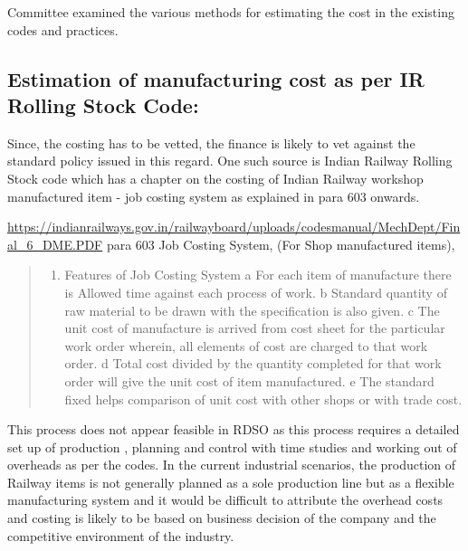 \documentclass[
  11pt,
  twoside]{article}
\providecommand{\tightlist}{%
  \setlength{\itemsep}{0pt}\setlength{\parskip}{0pt}}
\begin{document}
Committee examined the various methods for estimating the cost in the existing codes and practices.

\hypertarget{estimation-of-manufacturing-cost-as-per-ir-rolling-stock-code}{%
\subsection{Estimation of manufacturing cost as per IR Rolling Stock Code:}\label{estimation-of-manufacturing-cost-as-per-ir-rolling-stock-code}}

Since, the costing has to be vetted, the finance is likely to vet against the standard policy issued in this regard. One such source is Indian Railway Rolling Stock code which has a chapter on the costing of Indian Railway workshop manufactured item - job costing system as explained in para 603 onwards.

\url{https://indianrailways.gov.in/railwayboard/uploads/codesmanual/MechDept/Final_6_DME.PDF} para 603 Job Costing System, (For Shop manufactured items),

\begin{quote}
\begin{enumerate}
\def\labelenumi{\arabic{enumi}.}
\setcounter{enumi}{604}
\tightlist
\item
  Features of Job Costing System a For each item of manufacture there is Allowed time against each process of work. b Standard quantity of raw material to be drawn with the specification is also given. c The unit cost of manufacture is arrived from cost sheet for the particular work order wherein, all elements of cost are charged to that work order. d Total cost divided by the quantity completed for that work order will give the unit cost of item manufactured. e The standard fixed helps comparison of unit cost with other shops or with trade cost.
\end{enumerate}
\end{quote}

This process does not appear feasible in RDSO as this process requires a detailed set up of production , planning and control with time studies and working out of overheads as per the codes. In the current industrial scenarios, the production of Railway items is not generally planned as a sole production line but as a flexible manufacturing system and it would be difficult to attribute the overhead costs and costing is likely to be based on business decision of the company and the competitive environment of the industry.
\end{document}
